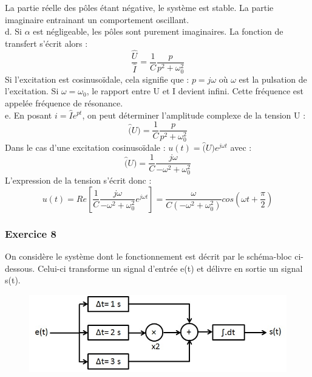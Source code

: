 \documentclass[11pt]{report}
\begin{document}
 	La partie réelle des pôles étant négative, le système est stable. La partie imaginaire entrainant un comportement oscillant. \\
 	
 	d. Si $\alpha$ est négligeable, les pôles sont purement imaginaires. La fonction de transfert s'écrit alors :
 	\begin{equation*}
 	\frac{\hat{U}}{\hat{I}}=\frac{1}{C}\frac{p}{p^2+\omega_0^2}
 	\end{equation*}
 	Si l'excitation est cosinusoïdale, cela signifie que : $p = j\omega$ où $\omega$ est la pulsation de l'excitation. Si $\omega=\omega_0$, le rapport entre U et I devient infini. Cette fréquence est appelée fréquence de résonance.\\
 	
 	e. En posant $i=\hat{I}e^{pt}$, on peut déterminer l'amplitude complexe de la tension U : 
 	\begin{equation*}
 	\hat(U)=\frac{1}{C}\frac{p}{p^2+\omega_0^2}
 	\end{equation*}
 	Dans le cas d'une excitation cosinusoïdale : $u(t)=\hat(U)e^{j\omega t}$ avec :
 	\begin{equation*}
 	\hat(U)=\frac{1}{C}\frac{j\omega}{-\omega^2+\omega_0^2}
 	\end{equation*}
 	L'expression de la tension s'écrit donc :
 	\begin{equation*}
 	u(t)=Re[\frac{1}{C}\frac{j\omega}{-\omega^2+\omega_0^2}e^{j\omega t}]=\frac{\omega}{C(-\omega^2+\omega_0^2)}cos(\omega t+\frac{\pi}{2})
 	\end{equation*}
 	
 	
 	
 	
 	
 	\subsubsection{Exercice 8}
 	
 	On considère le système dont le fonctionnement est décrit par le schéma-bloc ci-dessous. Celui-ci transforme un signal d'entrée e(t) et délivre en sortie un signal s(t). 
 	
 	\begin{figure}[h!]
 		\centering
 		\includegraphics[scale=0.5]{images/Exo_2_6.jpg} 
 	\end{figure}
 
\end{document}
